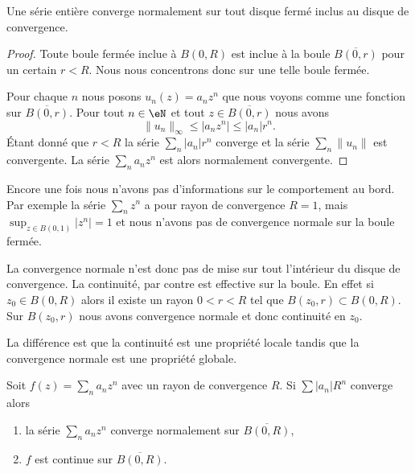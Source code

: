 \begin{theorem}
    Une série entière converge normalement sur tout disque fermé inclus au disque de convergence.
\end{theorem}

\begin{proof}
    Toute boule fermée inclue à \( B(0,R)\) est inclue à la boule \( \overline{ B(0,r) }\) pour un certain \( r<R\). Nous nous concentrons donc sur une telle boule fermée.

    Pour chaque \( n\) nous posons \( u_n(z)=a_nz^n\) que nous voyons comme une fonction sur \( \overline{ B(0,r) }\). Pour tout \( n\in \eN\) et tout \( z\in\overline{ B(0,r) }\) nous avons 
    \begin{equation}
        \| u_n \|_{\infty}\leq| a_nz^n |\leq | a_n |r^n.
    \end{equation}
    Étant donné que \( r<R\) la série \( \sum_n | a_n |r^n\) converge et la série \( \sum_n\| u_n \|\) est convergente. La série \( \sum_na_nz^n\) est alors normalement convergente.
\end{proof}

\begin{example}
    Encore une fois nous n'avons pas d'informations sur le comportement au bord. Par exemple la série \( \sum_nz^n\) a pour rayon de convergence \( R=1\), mais \( \sup_{z\in B(0,1)}| z^n |=1\) et nous n'avons pas de convergence normale sur la boule fermée.
\end{example}

La convergence normale n'est donc pas de mise sur tout l'intérieur du disque de convergence. La continuité, par contre est effective sur la boule. En effet si \( z_0\in B(0,R)\) alors il existe un rayon \( 0<r<R\) tel que \( B(z_0,r)\subset B(0,R)\). Sur \( B(z_0,r)\) nous avons convergence normale et donc continuité en \( z_0\).

La différence est que la continuité est une propriété locale tandis que la convergence normale est une propriété globale.

\begin{proposition}
    Soit \( f(z)=\sum_na_nz^n\) avec un rayon de convergence \( R\). Si \( \sum | a_n |R^n\) converge alors
    \begin{enumerate}
        \item
            la série \( \sum_na_nz^n\) converge normalement sur \( \overline{ B(0,R) }\),
        \item
            \( f\) est continue sur \( \overline{ B(0,R) }\).
    \end{enumerate}
\end{proposition}

